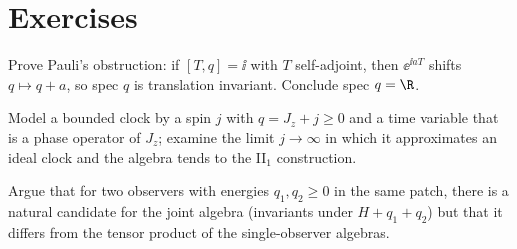 \section*{Exercises}
\begin{exercise}
Prove Pauli's obstruction: if $[T,q]=\ii$ with $T$ self-adjoint, then $\ee^{\ii aT}$ shifts $q\mapsto q+a$, so spec $q$ is translation invariant. Conclude spec $q=\R$.
\end{exercise}
\begin{exercise}
Model a bounded clock by a spin $j$ with $q=J_z+j\ge0$ and a time variable that is a phase operator of $J_z$; examine the limit $j\to\infty$ in which it approximates an ideal clock and the algebra tends to the II$_1$ construction.
\end{exercise}
\begin{exercise}
Argue that for two observers with energies $q_1,q_2\ge0$ in the same patch, there is a natural candidate for the joint algebra (invariants under $H+q_1+q_2$) but that it differs from the tensor product of the single-observer algebras.
\end{exercise}
